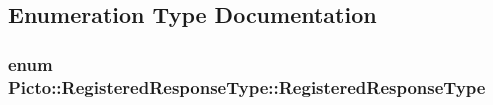 \subsection{Enumeration Type Documentation}
\hypertarget{namespace_picto_1_1_registered_response_type_abc60624d7d7b5a5d029fdaf2404311d2}{
\subsubsection[{Registered\-Response\-Type}]{\setlength{\rightskip}{0pt plus 5cm}enum {\bf Picto\-::\-Registered\-Response\-Type\-::\-Registered\-Response\-Type}}}\label{namespace_picto_1_1_registered_response_type_abc60624d7d7b5a5d029fdaf2404311d2}
